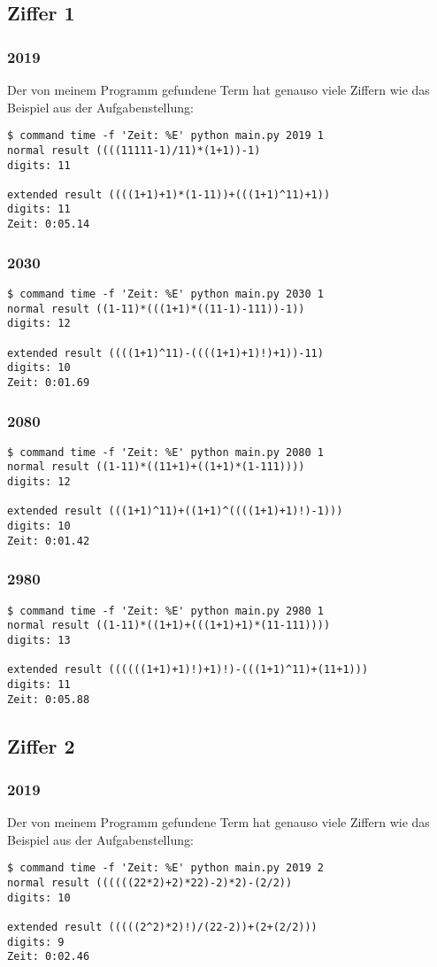 \subsection{Ziffer 1}
\subsubsection{2019}
Der von meinem Programm gefundene Term hat genauso viele Ziffern wie das Beispiel aus der Aufgabenstellung:
\begin{lstlisting}
$ command time -f 'Zeit: %E' python main.py 2019 1
normal result ((((11111-1)/11)*(1+1))-1)
digits: 11

extended result ((((1+1)+1)*(1-11))+(((1+1)^11)+1))
digits: 11
Zeit: 0:05.14
\end{lstlisting}
\subsubsection{2030}
\begin{lstlisting}
$ command time -f 'Zeit: %E' python main.py 2030 1
normal result ((1-11)*(((1+1)*((11-1)-111))-1))
digits: 12

extended result ((((1+1)^11)-((((1+1)+1)!)+1))-11)
digits: 10
Zeit: 0:01.69
\end{lstlisting}
\subsubsection{2080}
\begin{lstlisting}
$ command time -f 'Zeit: %E' python main.py 2080 1
normal result ((1-11)*((11+1)+((1+1)*(1-111))))
digits: 12

extended result (((1+1)^11)+((1+1)^((((1+1)+1)!)-1)))
digits: 10
Zeit: 0:01.42
\end{lstlisting}
\subsubsection{2980}
\begin{lstlisting}
$ command time -f 'Zeit: %E' python main.py 2980 1
normal result ((1-11)*((1+1)+(((1+1)+1)*(11-111))))
digits: 13

extended result ((((((1+1)+1)!)+1)!)-(((1+1)^11)+(11+1)))
digits: 11
Zeit: 0:05.88
\end{lstlisting}
\subsection{Ziffer 2}
\subsubsection{2019}
Der von meinem Programm gefundene Term hat genauso viele Ziffern wie das Beispiel aus der Aufgabenstellung:
\begin{lstlisting}
$ command time -f 'Zeit: %E' python main.py 2019 2
normal result ((((((22*2)+2)*22)-2)*2)-(2/2))
digits: 10

extended result (((((2^2)*2)!)/(22-2))+(2+(2/2)))
digits: 9
Zeit: 0:02.46
\end{lstlisting}
